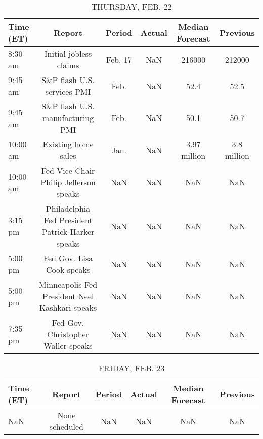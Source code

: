 \documentclass{article}%
\begin{document}
%


\begin{table}[htbp]%
\caption{THURSDAY, FEB. 22}%
\centering%
\begin{adjustbox}{width=1\textwidth}%
\begin{tabular}{lccccc}
\toprule
Time (ET) &                                           Report &  Period & Actual & Median Forecast &    Previous \\
\midrule
  8:30 am &                           Initial jobless claims & Feb. 17 &    NaN &          216000 &      212000 \\
  9:45 am &                      S\&P flash U.S. services PMI &    Feb. &    NaN &            52.4 &        52.5 \\
  9:45 am &                 S\&P flash U.S. manufacturing PMI &    Feb. &    NaN &            50.1 &        50.7 \\
 10:00 am &                              Existing home sales &    Jan. &    NaN &    3.97 million & 3.8 million \\
 10:00 am &           Fed Vice Chair Philip Jefferson speaks &     NaN &    NaN &             NaN &         NaN \\
  3:15 pm & Philadelphia Fed President Patrick Harker speaks &     NaN &    NaN &             NaN &         NaN \\
  5:00 pm &                        Fed Gov. Lisa Cook speaks &     NaN &    NaN &             NaN &         NaN \\
  5:00 pm &   Minneapolis Fed President Neel Kashkari speaks &     NaN &    NaN &             NaN &         NaN \\
  7:35 pm &               Fed Gov. Christopher Waller speaks &     NaN &    NaN &             NaN &         NaN \\
\bottomrule
\end{tabular}
%
\end{adjustbox}%
\end{table}

%


\begin{table}[htbp]%
\caption{FRIDAY, FEB. 23}%
\centering%
\begin{adjustbox}{width=1\textwidth}%
\begin{tabular}{lccccc}
\toprule
Time (ET) &         Report & Period & Actual & Median Forecast & Previous \\
\midrule
      NaN & None scheduled &    NaN &    NaN &             NaN &      NaN \\
\bottomrule
\end{tabular}
%
\end{adjustbox}%
\end{table}
\end{document}

